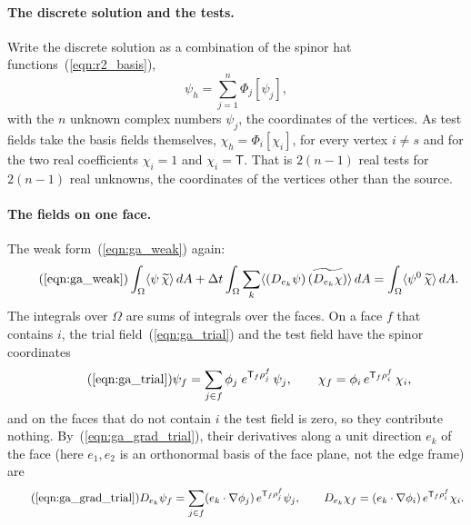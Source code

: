 \paragraph{The discrete solution and the tests.} Write the discrete solution as a combination of the spinor hat functions~(\ref{eqn:r2_basis}),
\begin{equation*}
\psi_h = \sum_{j=1}^n \Phi_j[\psi_j] ,
\end{equation*}
with the $n$ unknown complex numbers $\psi_j$, the coordinates of the vertices. As test fields take the basis fields themselves, $\chi_h = \Phi_i[\chi_i]$, for every vertex $i \ne s$ and for the two real coefficients $\chi_i = 1$ and $\chi_i = \mathsf T$. That is $2(n - 1)$ real tests for $2(n - 1)$ real unknowns, the coordinates of the vertices other than the source.

\paragraph{The fields on one face.} The weak form~(\ref{eqn:ga_weak}) again:
\begin{equation*}
\tag{\ref{eqn:ga_weak}}
\int_\Omega \langle \psi\, \widetilde\chi \rangle\, dA + \Delta t \int_\Omega \sum_k \langle (D_{e_k} \psi)\, \widetilde{(D_{e_k} \chi)} \rangle\, dA = \int_\Omega \langle \psi^0\, \widetilde\chi \rangle\, dA .
\end{equation*}
The integrals over $\Omega$ are sums of integrals over the faces. On a face $f$ that contains $i$, the trial field~(\ref{eqn:ga_trial}) and the test field have the spinor coordinates
\begin{equation*}
\tag{\ref{eqn:ga_trial}}
\psi_f = \sum_{j \in f} \phi_j\; e^{\mathsf T_f \rho_j^f}\, \psi_j, \qquad \chi_f = \phi_i\, e^{\mathsf T_f\rho_i^f}\,\chi_i ,
\end{equation*}
and on the faces that do not contain $i$ the test field is zero, so they contribute nothing. By~(\ref{eqn:ga_grad_trial}), their derivatives along a unit direction $e_k$ of the face (here $e_1, e_2$ is an orthonormal basis of the face plane, not the edge frame) are
\begin{equation*}
\tag{\ref{eqn:ga_grad_trial}}
D_{e_k}\psi_f = \sum_{j\in f}(e_k\cdot\nabla\phi_j)\, e^{\mathsf T_f\rho_j^f}\psi_j, \qquad D_{e_k}\chi_f = (e_k\cdot\nabla\phi_i)\, e^{\mathsf T_f\rho_i^f}\chi_i .
\end{equation*}

